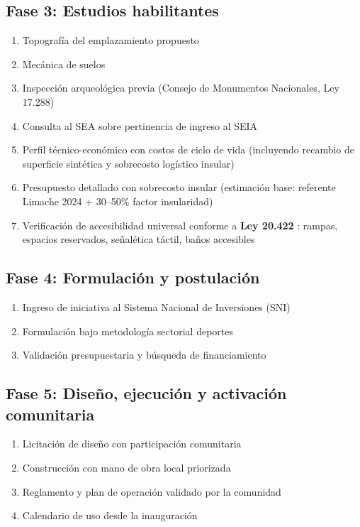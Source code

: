 \documentclass[12pt, a4paper]{article}
\begin{document}
\subsection{Fase 3: Estudios habilitantes}

\begin{enumerate}[leftmargin=*, itemsep=3pt]
  \item Topografía del emplazamiento propuesto
  \item Mecánica de suelos
  \item Inspección arqueológica previa (Consejo de Monumentos Nacionales, Ley 17.288)
  \item Consulta al SEA sobre pertinencia de ingreso al SEIA \citep{SEAguias}
  \item Perfil técnico-económico con costos de ciclo de vida (incluyendo recambio
        de superficie sintética y sobrecosto logístico insular)
  \item Presupuesto detallado con sobrecosto insular (estimación base: referente
        Limache 2024 + 30--50\% factor insularidad) \citep{PistaLimache2024}
  \item Verificación de accesibilidad universal conforme a \textbf{Ley 20.422}
        \citep{Ley20422}: rampas, espacios reservados, señalética táctil, baños accesibles
\end{enumerate}

\subsection{Fase 4: Formulación y postulación}

\begin{enumerate}[leftmargin=*, itemsep=3pt]
  \item Ingreso de iniciativa al Sistema Nacional de Inversiones (SNI)
  \item Formulación bajo metodología sectorial deportes \citep{SNIdeportes}
  \item Validación presupuestaria y búsqueda de financiamiento
\end{enumerate}

\subsection{Fase 5: Diseño, ejecución y activación comunitaria}

\begin{enumerate}[leftmargin=*, itemsep=3pt]
  \item Licitación de diseño con participación comunitaria
  \item Construcción con mano de obra local priorizada
  \item Reglamento y plan de operación validado por la comunidad
  \item Calendario de uso desde la inauguración
\end{enumerate}
\end{document}

